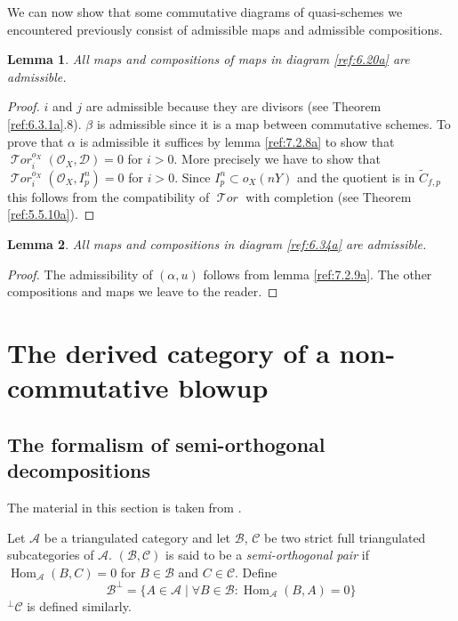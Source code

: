 \documentclass{amsproc}
\def\Ascr{{\mathcal A}}
\def\Bscr{{\mathcal B}}
\def\Cscr{{\mathcal C}}
\def\Dscr{{\mathcal D}}
\def\Oscr{{\mathcal O}}
\def\Tscr{{\mathcal T}}
\def\HTor{\operatorname {\Tscr \mathit{or}}}
\def\Hom{\operatorname {Hom}}
\def\HTor{\operatorname {\Tscr \mathit{or}}}
\newtheorem{lemmas}{Lemma}[subsection]
\theoremstyle{definition}
\theoremstyle{remark}
\numberwithin{equation}{section}
\numberwithin{table}{section}
\numberwithin{figure}{section}
\begin{document}
We can now show that some commutative diagrams of quasi-schemes
we encountered previously  consist of admissible maps and admissible
compositions. 
\begin{lemmas} 
\label{ref:7.2.12a}
All maps and compositions of maps in   diagram \eqref{ref:6.20a}
  are admissible.
\end{lemmas}
\begin{proof}
$i$ and $j$ are admissible because they are divisors (see Theorem \ref{ref:6.3.1a}.8). $\beta$ is admissible since it is a
map between commutative schemes. To prove that $\alpha$ is admissible it
suffices by lemma \ref{ref:7.2.8a} to show that
$\HTor_i^{o_X}(\Oscr_X,\Dscr)=0$ for $i>0$. More precisely we have to
show that $\HTor_i^{o_X}(\Oscr_X,I^n_p)=0$ for $i>0$. Since
$I^n_p\subset o_X(nY)$ and the quotient is in $\tilde{C}_{f,p}$ this
follows from the compatibility of
$\HTor$ with completion (see Theorem \ref{ref:5.5.10a}).
\end{proof}

\begin{lemmas}
\label{ref:7.2.13a}
All maps and compositions in   diagram \eqref{ref:6.34a} are admissible.
\end{lemmas}
\begin{proof}
The admissibility of $(\alpha,u)$ follows from lemma \ref{ref:7.2.9a}. The
other compositions and maps we leave to the reader.
\end{proof}

\section{The derived category of a non-commutative blowup}
\label{ref:8a}
\subsection{The formalism of semi-orthogonal decompositions}
\label{ref:8.1a}
The material in this section is taken from \cite{Bondal2}. 

Let $\Ascr$ be a triangulated category and let $\Bscr$, $\Cscr$ be two
strict full triangulated subcategories of $\Ascr$.  $(\Bscr,\Cscr)$ is said to be a
\emph{semi-orthogonal pair} if $\Hom_\Ascr(B,C)=0$ for $B\in\Bscr$ and $C\in
\Cscr$. Define
\[
\Bscr^\perp=\{A\in\Ascr\mid \forall B\in\Bscr :\Hom_\Ascr(B,A)=0\}
\]
${}^\perp\Cscr$ is defined similarly.
\end{document}
